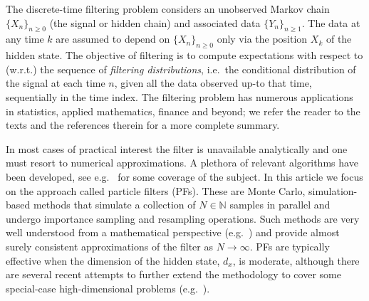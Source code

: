 \documentclass[english,13pt]{article}
\numberwithin{equation}{section}
\begin{document}
The discrete-time filtering problem considers an unobserved Markov chain $\{X_n\}_{n\geq 0}$ (the signal or hidden chain) and associated data
$\{Y_n\}_{n\geq 1}$.  The data at any time $k$ are assumed to depend on   $\{X_n\}_{n\geq 0}$ only via the position $X_k$ of the hidden state.  The objective of filtering is to compute expectations with respect to (w.r.t.) the sequence of \emph{filtering distributions}, i.e.~the conditional distribution of the signal at each time $n$,  given all the data observed up-to that time, sequentially in the time index. 
The filtering problem has numerous applications in statistics, applied mathematics, finance and beyond;  we refer the reader to the texts \cite{bain,cappe,delmoral} and the references therein for a more complete summary.

In most cases of practical interest  the filter is unavailable analytically and one must resort to numerical approximations.  A plethora of relevant algorithms have been developed,  see e.g.~\cite{bain,cappe,delmoral} for some coverage of the subject.  In this article we focus on the approach called particle filters (PFs).  These are Monte Carlo,  simulation-based methods that simulate a collection of $N\in\mathbb{N}$ samples in parallel and undergo importance sampling and resampling operations. Such methods are very well understood from a mathematical perspective (e.g.~\cite{delmoral}) and provide almost surely consistent approximations of the filter as $N\rightarrow\infty$.  PFs are typically effective when the dimension of the hidden state, $d_x$,  is moderate,  although there are several recent attempts to further extend the methodology to cover some special-case high-dimensional problems (e.g.~\cite{pf_ns,pf_sns}).
\end{document}
